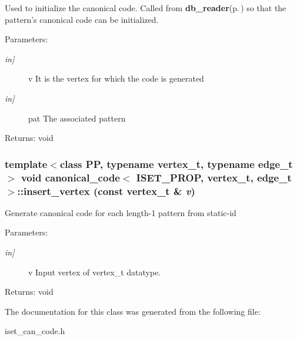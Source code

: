 Used to initialize the canonical code. Called from {\bf db\_\-reader}{\rm (p.\,\pageref{classdb__reader})} so that the pattern's canonical code can be initialized. \begin{Desc}
\item[Parameters:]
\begin{description}
\item[{\em in\mbox{]}}]v It is the vertex for which the code is generated \item[{\em in\mbox{]}}]pat The associated pattern \end{description}
\end{Desc}
\begin{Desc}
\item[Returns:]void \end{Desc}
\subsubsection{\setlength{\rightskip}{0pt plus 5cm}template$<$class PP, typename vertex\_\-t, typename edge\_\-t$>$ void {\bf canonical\_\-code}$<$ ISET\_\-PROP, vertex\_\-t, edge\_\-t $>$::insert\_\-vertex (const vertex\_\-t \& {\em v})\hspace{0.3cm}{\tt  [inline]}}\label{classcanonical__code_3_01ISET__PROP_00_01vertex__t_00_01edge__t_01_4_a2}


Generate canonical code for each length-1 pattern from static-id \begin{Desc}
\item[Parameters:]
\begin{description}
\item[{\em in\mbox{]}}]v Input vertex of vertex\_\-t datatype. \end{description}
\end{Desc}
\begin{Desc}
\item[Returns:]void \end{Desc}


The documentation for this class was generated from the following file:\begin{CompactItemize}
\item 
iset\_\-can\_\-code.h\end{CompactItemize}
